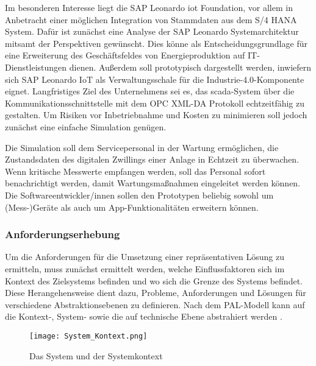 \noindent Im besonderen Interesse liegt die SAP Leonardo \ac{iot} Foundation, vor allem in Anbetracht einer möglichen Integration von Stammdaten aus dem S/4 HANA System. Dafür ist zunächst eine Analyse der SAP Leonardo Systemarchitektur mitsamt der Perspektiven gewünscht. Dies könne als Entscheidungsgrundlage für eine Erweiterung des Geschäftsfeldes von Energieproduktion auf IT-Dienstleistungen dienen. Außerdem soll prototypisch dargestellt werden, inwiefern sich SAP Leonardo IoT als Verwaltungsschale für die Industrie-4.0-Komponente eignet. Langfristiges Ziel des Unternehmens sei es, das \ac{scada}-System über die Kommunikationsschnittstelle mit dem OPC XML-DA Protokoll echtzeitfähig zu gestalten. Um Risiken vor Inbetriebnahme und Kosten zu minimieren soll jedoch zunächst eine einfache Simulation genügen.

\noindent Die Simulation soll dem Servicepersonal in der Wartung ermöglichen, die Zustandsdaten des digitalen Zwillings einer Anlage in Echtzeit zu überwachen. Wenn kritische Messwerte empfangen werden, soll das Personal sofort benachrichtigt werden, damit Wartungsmaßnahmen eingeleitet werden können. Die Softwareentwickler/innen sollen den Prototypen beliebig sowohl um (Mess-)Geräte als auch um App-Funktionalitäten erweitern können.

\subsubsection{Anforderungserhebung}

Um die Anforderungen für die Umsetzung einer repräsentativen Lösung zu ermitteln, muss zunächst ermittelt werden, welche Einflussfaktoren sich im Kontext des Zielsystems befinden und wo sich die Grenze des Systems befindet. Diese Herangehensweise dient dazu, Probleme, Anforderungen und Lösungen für verschiedene Abstraktionsebenen zu definieren. Nach dem PAL-Modell kann auf die Kontext-, System- sowie die auf technische Ebene abstrahiert werden \citep{Lauenroth2016}.

\begin{figure}[h]
  \centering
  \texttt{[image: System\_Kontext.png]}
  \caption[Das System und der Systemkontext]{Das System und der Systemkontext}
  \label{}
\end{figure}

